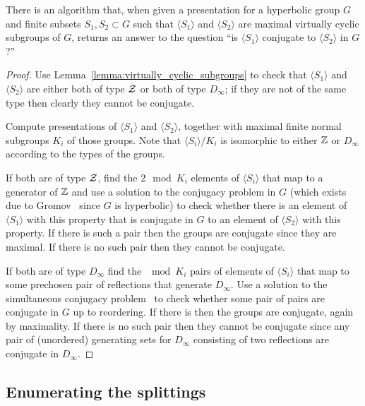 \begin{lemma}\label{lemma:detecting_conjugate_subgroups} 
  There is an algorithm that, when given a presentation for a hyperbolic group $G$ and finite subsets $S_1, S_2 \subset G$ such that $\langle S_1\rangle$ and $\langle S_2\rangle$ are maximal virtually cyclic subgroups of $G$, returns an answer to the question ``is $\langle S_1\rangle$ conjugate to $\langle S_2\rangle $ in $G$?''
\end{lemma}

\begin{proof}
  Use Lemma~\ref{lemma:virtually_cyclic_subgroups} to check that $\langle S_1\rangle$ and $\langle S_2\rangle$ are either both of type $\mathcal{Z}$ or both of type $D_\infty$; if they are not of the same type then clearly they cannot be conjugate.

  Compute presentations of $\langle S_1\rangle$ and $\langle S_2\rangle$, together with maximal finite normal subgroups $K_i$ of those groups.
  Note that $\langle S_i\rangle/K_i$ is isomorphic to either $\mathbb{Z}$ or $D_\infty$ according to the types of the groups.

  If both are of type $\mathcal{Z}$, find the $2\mod{K_i}$ elements of $\langle S_i\rangle$ that map to a generator of $\mathbb{Z}$ and use a solution to the conjugacy problem in $G$ (which exists due to Gromov~\cite{gromov87} since $G$ is hyperbolic) to check whether there is an element of $\langle S_1\rangle$ with this property that is conjugate in $G$ to an element of $\langle S_2\rangle$ with this property.
  If there is such a pair then the groups are conjugate since they are maximal.
  If there is no such pair then they cannot be conjugate.

  If both are of type $D_\infty$ find the $\mod{K_i}$ pairs of elements of $\langle S_i\rangle$ that map to some prechosen pair of reflections that generate $D_\infty$.
  Use a solution to the simultaneous conjugacy problem~\cite{bridsonhowie05,buckleyholt13} to check whether some pair of pairs are conjugate in $G$ up to reordering.
  If there is then the groups are conjugate, again by maximality.
  If there is no such pair then they cannot be conjugate since any pair of (unordered) generating sets for $D_\infty$ consisting of two reflections are conjugate in $D_\infty$.
\end{proof}

\subsection{Enumerating the splittings}\label{section:computing_non_trivial_splitting}

